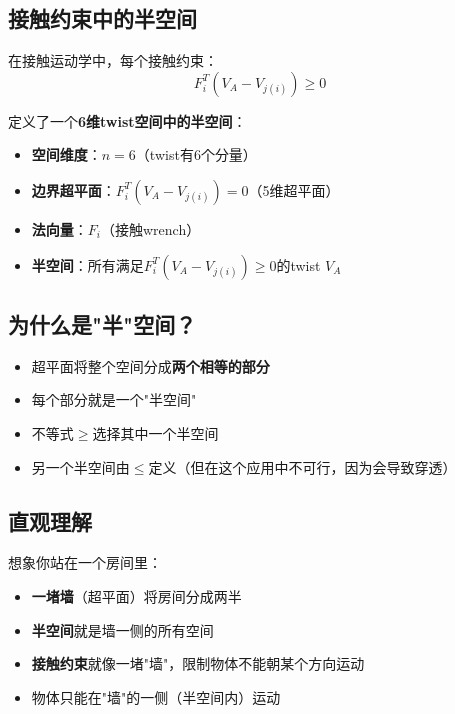 \documentclass[12pt,a4paper]{article}
\begin{document}
\subsection{接触约束中的半空间}

在接触运动学中，每个接触约束：
\begin{equation}
F_i^T (V_A - V_{j(i)}) \geq 0
\end{equation}

定义了一个\textbf{6维twist空间中的半空间}：

\begin{itemize}
\item \textbf{空间维度}：$n = 6$（twist有6个分量）
\item \textbf{边界超平面}：$F_i^T (V_A - V_{j(i)}) = 0$（5维超平面）
\item \textbf{法向量}：$F_i$（接触wrench）
\item \textbf{半空间}：所有满足$F_i^T (V_A - V_{j(i)}) \geq 0$的twist $V_A$
\end{itemize}

\subsection{为什么是"半"空间？}

\begin{itemize}
\item 超平面将整个空间分成\textbf{两个相等的部分}
\item 每个部分就是一个"半空间"
\item 不等式$\geq$选择其中一个半空间
\item 另一个半空间由$\leq$定义（但在这个应用中不可行，因为会导致穿透）
\end{itemize}

\subsection{直观理解}

想象你站在一个房间里：

\begin{itemize}
\item \textbf{一堵墙}（超平面）将房间分成两半
\item \textbf{半空间}就是墙一侧的所有空间
\item \textbf{接触约束}就像一堵"墙"，限制物体不能朝某个方向运动
\item 物体只能在"墙"的一侧（半空间内）运动
\end{itemize}
\end{document}
